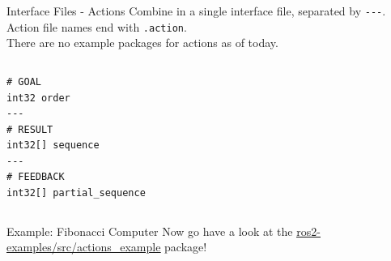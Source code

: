 \begin{frame}[fragile]{Interface Files - Actions}
Combine  in a single interface file, separated by \texttt{-{}-{}-}.\\
Action file names end with \texttt{.action}.\\
There are no example packages for actions as of today.
\begin{columns}
\begin{lstlisting}[language=ros2msg, caption=Definition of the \texttt{ros2\_examples\_interfaces/action/Fibonacci} action]
# GOAL
int32 order
---
# RESULT
int32[] sequence
---
# FEEDBACK
int32[] partial_sequence
\end{lstlisting}
\end{columns}
\end{frame}

\begin{frame}{Example: Fibonacci Computer}
Now go have a look at the \href{https://github.com/IntelligentSystemsLabUTV/ros2-examples/tree/galactic/src/actions_example}{\color{blue}\underline{ros2-examples/src/actions\_example}} package!
\end{frame}

